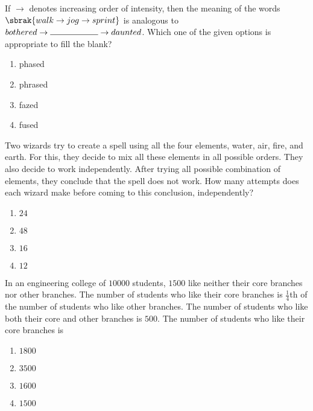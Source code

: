 \iffalse
	\title{2024-ST-1-13}
	\author{EE24Btech11006 - Arnav Mahishi}
	\section{st}
	\chapter{2024}
\fi
\item{
 If $\rightarrow$ denotes increasing order of intensity, then the meaning of the words $\sbrak{walk\rightarrow jog\rightarrow sprint}$ is analogous to $bothered\rightarrow\rule{2cm}{0.15mm}\rightarrow daunted$. Which one of the given options is appropriate to fill the blank?
\begin{multicols}{4}
\begin{enumerate}
\item phased
\item phrased
\item fazed
\item fused
\end{enumerate}
\end{multicols}
}
\item{
Two wizards try to create a spell using all the four elements, water, air, fire, and earth. For this, they decide to mix all these elements in all possible orders. They also decide to work independently. After trying all possible combination of elements, they conclude that the spell does not work.
How many attempts does each wizard make before coming to this conclusion, independently?
\begin{multicols}{4}
\begin{enumerate}
\item $24$ 
\item $48$ 
\item $16$
\item $12$
\end{enumerate}
\end{multicols}}
\item{
In an engineering college of $10000$ students, $1500$ like neither their core branches nor other branches. The number of students who like their core branches is $\frac{1}{4}$th of the number of students who like other branches. The number of students who like both their core and other branches is $500$.
The number of students who like their core branches is
\begin{multicols}{4}
\begin{enumerate}
\item $1800$
\item $3500$
\item $1600$
\item $1500$
\end{enumerate}
\end{multicols}
}
